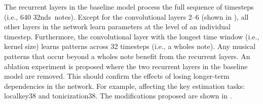 
The recurrent layers in the baseline model process the full
sequence of timesteps (i.e., 640 \glspl{32nd}~notes). Except
for the convolutional layers 2--6 (shown in
), all other layers
in the network learn parameters at the level of an
individual timestep. Furthermore, the convolutional layer
with the longest time window (i.e., kernel size) learns
patterns across 32 timesteps (i.e., a \glspl{whole} note).
Any musical patterns that occur beyond a \glspl{whole} note
benefit from the recurrent layers. An ablation experiment is
proposed where the two recurrent layers in the baseline
model are removed. This should confirm the effects of losing
longer-term dependencies in the network. For example,
affecting the key estimation tasks: \gls{localkey38} and
\gls{tonicization38}. The modifications proposed are shown
in .

